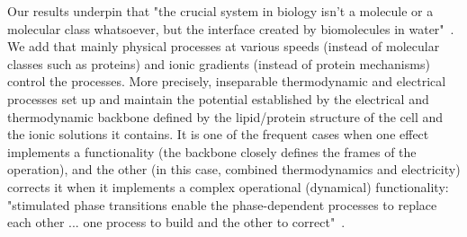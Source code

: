 Our results underpin that "the crucial system in biology isn't a molecule or a molecular class whatsoever, but the interface created by biomolecules in water"~\cite{LivingSystemPhysics:2021}. We add that mainly
physical processes at various speeds (instead of molecular classes such as proteins) and ionic gradients (instead of protein mechanisms) control the processes.
More precisely, inseparable thermodynamic and electrical processes set up and maintain the potential established by the electrical and thermodynamic backbone defined by the lipid/protein structure of the cell and the ionic solutions it contains. It is one of the frequent cases when 
one effect implements a functionality (the backbone closely defines the frames of the operation), and the other (in this case, combined thermodynamics and electricity) corrects it when it implements a complex operational (dynamical) functionality:
"stimulated phase transitions enable the phase-dependent processes to replace each other ... one process to build and the other
to correct"~\cite{BiologicalConservationLaw:2017}.
\else

\fi

